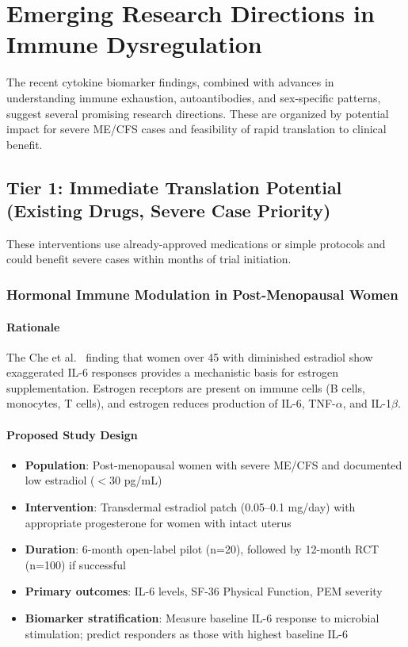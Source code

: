 \section{Emerging Research Directions in Immune Dysregulation}
\label{sec:immune-research-directions}

The recent cytokine biomarker findings, combined with advances in understanding immune exhaustion, autoantibodies, and sex-specific patterns, suggest several promising research directions. These are organized by potential impact for severe ME/CFS cases and feasibility of rapid translation to clinical benefit.

\subsection{Tier 1: Immediate Translation Potential (Existing Drugs, Severe Case Priority)}
\label{sec:tier1-research}

These interventions use already-approved medications or simple protocols and could benefit severe cases within months of trial initiation.

\subsubsection{Hormonal Immune Modulation in Post-Menopausal Women}

\paragraph{Rationale}
The Che et al.~\cite{Che2025} finding that women over 45 with diminished estradiol show exaggerated IL-6 responses provides a mechanistic basis for estrogen supplementation. Estrogen receptors are present on immune cells (B cells, monocytes, T cells), and estrogen reduces production of IL-6, TNF-$\alpha$, and IL-1$\beta$.

\paragraph{Proposed Study Design}
\begin{itemize}
    \item \textbf{Population}: Post-menopausal women with severe ME/CFS and documented low estradiol ($<$30 pg/mL)
    \item \textbf{Intervention}: Transdermal estradiol patch (0.05--0.1 mg/day) with appropriate progesterone for women with intact uterus
    \item \textbf{Duration}: 6-month open-label pilot (n=20), followed by 12-month RCT (n=100) if successful
    \item \textbf{Primary outcomes}: IL-6 levels, SF-36 Physical Function, PEM severity
    \item \textbf{Biomarker stratification}: Measure baseline IL-6 response to microbial stimulation; predict responders as those with highest baseline IL-6
\end{itemize}

